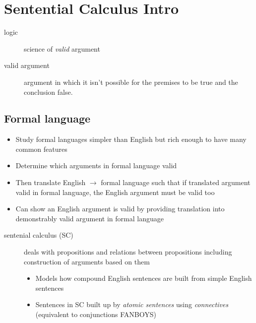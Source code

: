 \section{Sentential Calculus Intro}
\begin{description}
	\item[logic] science of \textit{valid} argument
	\item[valid argument] argument in which it isn't possible for the
		premises to be true and the conclusion false.
\end{description}

\subsection{Formal language}
\begin{itemize}
	\item Study formal languages simpler than English but rich enough to have
	      many common features
	\item Determine which arguments in formal language valid
	\item Then translate English $\to$ formal language such that if translated
	      argument valid in formal language, the English argument must be
	      valid too
	\item Can show an English argument is valid by providing translation into
	      demonstrably valid argument in formal language
\end{itemize}

\begin{description}
	\item[sentenial calculus (SC)] deals with propositions and relations between
		propositions including construction of arguments based on them
		\begin{itemize}
			\item Models how compound English sentences are built from simple
			      English sentences
			\item Sentences in SC built up by \textit{atomic sentences} using
			      \textit{connectives} (equivalent to conjunctions FANBOYS)
		\end{itemize}
\end{description}

